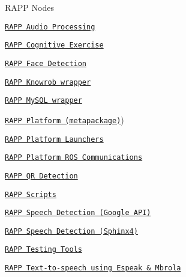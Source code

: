 R\-A\-P\-P Nodes
\begin{DoxyItemize}
\item \href{https://github.com/rapp-project/rapp-platform/wiki/RAPP-Audio-Processing}{\tt R\-A\-P\-P Audio Processing}
\item \href{https://github.com/rapp-project/rapp-platform/wiki/RAPP-Cognitive-Exercise}{\tt R\-A\-P\-P Cognitive Exercise}
\item \href{https://github.com/rapp-project/rapp-platform/wiki/RAPP-Face-Detection}{\tt R\-A\-P\-P Face Detection}
\item \href{https://github.com/rapp-project/rapp-platform/wiki/RAPP-Knowrob-wrapper}{\tt R\-A\-P\-P Knowrob wrapper}
\item \href{https://github.com/rapp-project/rapp-platform/wiki/RAPP-MySQL-wrapper}{\tt R\-A\-P\-P My\-S\-Q\-L wrapper}
\item \href{https://github.com/rapp-project/rapp-platform/wiki/RAPP-Platform-(metapackage}{\tt R\-A\-P\-P Platform (metapackage)})
\item \href{https://github.com/rapp-project/rapp-platform/wiki/RAPP-Platform-Launchers}{\tt R\-A\-P\-P Platform Launchers}
\item \href{https://github.com/rapp-project/rapp-platform/wiki/RAPP-Platform-ROS-Communications}{\tt R\-A\-P\-P Platform R\-O\-S Communications}
\item \href{https://github.com/rapp-project/rapp-platform/wiki/RAPP-QR-Detection}{\tt R\-A\-P\-P Q\-R Detection}
\item \href{https://github.com/rapp-project/rapp-platform/wiki/RAPP-Scripts}{\tt R\-A\-P\-P Scripts}
\item \href{https://github.com/rapp-project/rapp-platform/wiki/RAPP-Speech-Detection-using-Google-API}{\tt R\-A\-P\-P Speech Detection (Google A\-P\-I)}
\item \href{https://github.com/rapp-project/rapp-platform/wiki/RAPP-Speech-Detection-using-Sphinx4}{\tt R\-A\-P\-P Speech Detection (Sphinx4)}
\item \href{https://github.com/rapp-project/rapp-platform/wiki/RAPP-Testing-Tools}{\tt R\-A\-P\-P Testing Tools}
\item \href{https://github.com/rapp-project/rapp-platform/wiki/RAPP-Text-to-speech-using-Espeak-&-Mbrola}{\tt R\-A\-P\-P Text-\/to-\/speech using Espeak \& Mbrola}
\end{DoxyItemize}

